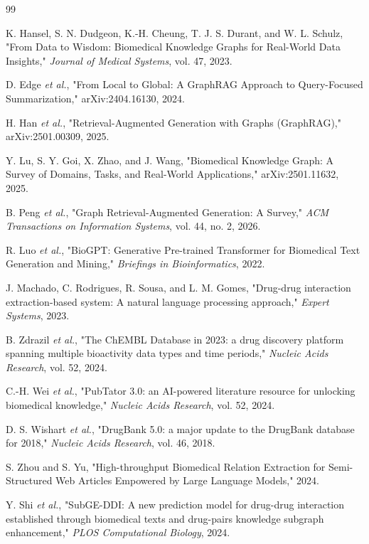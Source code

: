 \documentclass[conference]{Template/IEEEtran}
\begin{document}
\begin{thebibliography}{99}

K. Hansel, S. N. Dudgeon, K.-H. Cheung, T. J. S. Durant, and W. L. Schulz,
"From Data to Wisdom: Biomedical Knowledge Graphs for Real-World Data Insights," \textit{Journal of Medical Systems}, vol. 47, 2023.

D. Edge \textit{et al.},
"From Local to Global: A GraphRAG Approach to Query-Focused Summarization," arXiv:2404.16130, 2024.

H. Han \textit{et al.},
"Retrieval-Augmented Generation with Graphs (GraphRAG)," arXiv:2501.00309, 2025.

Y. Lu, S. Y. Goi, X. Zhao, and J. Wang,
"Biomedical Knowledge Graph: A Survey of Domains, Tasks, and Real-World Applications," arXiv:2501.11632, 2025.

B. Peng \textit{et al.},
"Graph Retrieval-Augmented Generation: A Survey," \textit{ACM Transactions on Information Systems}, vol. 44, no. 2, 2026.

R. Luo \textit{et al.},
"BioGPT: Generative Pre-trained Transformer for Biomedical Text Generation and Mining," \textit{Briefings in Bioinformatics}, 2022.

J. Machado, C. Rodrigues, R. Sousa, and L. M. Gomes,
"Drug-drug interaction extraction-based system: A natural language processing approach," \textit{Expert Systems}, 2023.

B. Zdrazil \textit{et al.},
"The ChEMBL Database in 2023: a drug discovery platform spanning multiple bioactivity data types and time periods," \textit{Nucleic Acids Research}, vol. 52, 2024.

C.-H. Wei \textit{et al.},
"PubTator 3.0: an AI-powered literature resource for unlocking biomedical knowledge," \textit{Nucleic Acids Research}, vol. 52, 2024.

D. S. Wishart \textit{et al.},
"DrugBank 5.0: a major update to the DrugBank database for 2018," \textit{Nucleic Acids Research}, vol. 46, 2018.

S. Zhou and S. Yu,
"High-throughput Biomedical Relation Extraction for Semi-Structured Web Articles Empowered by Large Language Models," 2024.

Y. Shi \textit{et al.},
"SubGE-DDI: A new prediction model for drug-drug interaction established through biomedical texts and drug-pairs knowledge subgraph enhancement," \textit{PLOS Computational Biology}, 2024.


\end{thebibliography}
\end{document}
